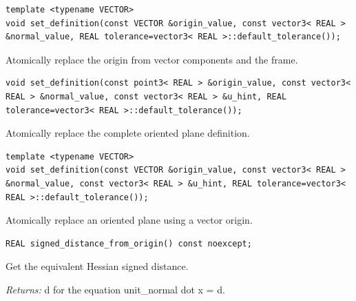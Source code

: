 \par\noindent\begin{minipage}{\linewidth}
\begin{lstlisting}[style=apireference]
template <typename VECTOR>
void set_definition(const VECTOR &origin_value, const vector3< REAL > &normal_value, REAL tolerance=vector3< REAL >::default_tolerance());
\end{lstlisting}
{\footnotesize Atomically replace the origin from vector components and the frame.\par}
\end{minipage}\par\vspace{1pt}
\par\noindent\begin{minipage}{\linewidth}
\begin{lstlisting}[style=apireference]
void set_definition(const point3< REAL > &origin_value, const vector3< REAL > &normal_value, const vector3< REAL > &u_hint, REAL tolerance=vector3< REAL >::default_tolerance());
\end{lstlisting}
{\footnotesize Atomically replace the complete oriented plane definition.\par}
\end{minipage}\par\vspace{1pt}
\par\noindent\begin{minipage}{\linewidth}
\begin{lstlisting}[style=apireference]
template <typename VECTOR>
void set_definition(const VECTOR &origin_value, const vector3< REAL > &normal_value, const vector3< REAL > &u_hint, REAL tolerance=vector3< REAL >::default_tolerance());
\end{lstlisting}
{\footnotesize Atomically replace an oriented plane using a vector origin.\par}
\end{minipage}\par\vspace{1pt}
\par\noindent\begin{minipage}{\linewidth}
\begin{lstlisting}[style=apireference]
REAL signed_distance_from_origin() const noexcept;
\end{lstlisting}
{\footnotesize Get the equivalent Hessian signed distance.\par}
{\footnotesize\textit{Returns:} d for the equation unit\_normal dot x = d.\par}
\end{minipage}\par\vspace{1pt}
